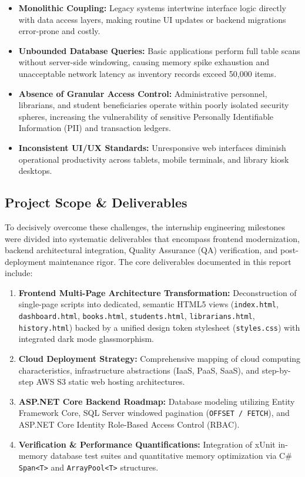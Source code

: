 \documentclass[10pt,journal,compsoc]{IEEEtran}
\begin{document}
\begin{itemize}[leftmargin=1.5em]
    \item \textbf{Monolithic Coupling:} Legacy systems intertwine interface logic directly with data access layers, making routine UI updates or backend migrations error-prone and costly.
    \item \textbf{Unbounded Database Queries:} Basic applications perform full table scans without server-side windowing, causing memory spike exhaustion and unacceptable network latency as inventory records exceed 50,000 items.
    \item \textbf{Absence of Granular Access Control:} Administrative personnel, librarians, and student beneficiaries operate within poorly isolated security spheres, increasing the vulnerability of sensitive Personally Identifiable Information (PII) and transaction ledgers.
    \item \textbf{Inconsistent UI/UX Standards:} Unresponsive web interfaces diminish operational productivity across tablets, mobile terminals, and library kiosk desktops.
\end{itemize}

\subsection{Project Scope \& Deliverables}
To decisively overcome these challenges, the internship engineering milestones were divided into systematic deliverables that encompass frontend modernization, backend architectural integration, Quality Assurance (QA) verification, and post-deployment maintenance rigor. The core deliverables documented in this report include:

\begin{enumerate}[leftmargin=1.5em]
    \item \textbf{Frontend Multi-Page Architecture Transformation:} Deconstruction of single-page scripts into dedicated, semantic HTML5 views (\texttt{index.html}, \texttt{dashboard.html}, \texttt{books.html}, \texttt{students.html}, \texttt{librarians.html}, \texttt{history.html}) backed by a unified design token stylesheet (\texttt{styles.css}) with integrated dark mode glassmorphism.
    \item \textbf{Cloud Deployment Strategy:} Comprehensive mapping of cloud computing characteristics, infrastructure abstractions (IaaS, PaaS, SaaS), and step-by-step AWS S3 static web hosting architectures.
    \item \textbf{ASP.NET Core Backend Roadmap:} Database modeling utilizing Entity Framework Core, SQL Server windowed pagination (\texttt{OFFSET / FETCH}), and ASP.NET Core Identity Role-Based Access Control (RBAC).
    \item \textbf{Verification \& Performance Quantifications:} Integration of xUnit in-memory database test suites and quantitative memory optimization via C\# \texttt{Span<T>} and \texttt{ArrayPool<T>} structures.
\end{enumerate}
\end{document}

